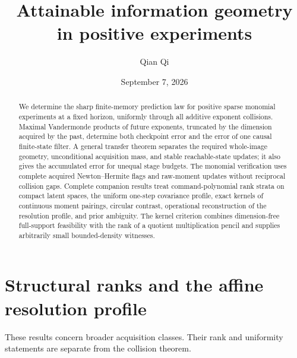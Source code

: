 \documentclass[11pt]{amsart}
\title[Attainable information geometry]{Attainable information geometry\\ in positive experiments}
\author{Qian Qi}
\date{September 7, 2026}
\theoremstyle{definition}\newtheorem{definition}[theorem]{Definition}
\theoremstyle{remark}\newtheorem{remark}[theorem]{Remark}
\begin{document}
\begin{abstract}
We determine the sharp finite-memory prediction law for positive sparse
monomial experiments at a fixed horizon, uniformly through all additive
exponent collisions. Maximal Vandermonde products of future exponents,
truncated by the dimension acquired by the past, determine both
checkpoint error and the error of one causal finite-state filter.
A general transfer theorem separates the required whole-image geometry,
unconditional acquisition mass, and stable reachable-state updates; it
also gives the accumulated error for unequal stage budgets. The monomial
verification uses complete acquired Newton--Hermite flags and raw-moment
updates without reciprocal collision gaps. Complete companion results
treat command-polynomial rank strata on compact latent spaces, the
uniform one-step covariance profile, exact kernels of continuous moment
pairings, circular contrast, operational reconstruction of the resolution
profile, and prior ambiguity. The kernel criterion combines dimension-free
full-support feasibility with the rank of a quotient multiplication
pencil and supplies arbitrarily small bounded-density witnesses.
\end{abstract}
\maketitle











\appendix
\section{Structural ranks and the affine resolution profile}
\label{app:structural}
These results concern broader acquisition classes. Their rank and
uniformity statements are separate from the collision theorem.
\begingroup
\let\section\subsection
\let\subsection\subsubsection
\let\subsubsection\paragraph


\endgroup
\end{document}
